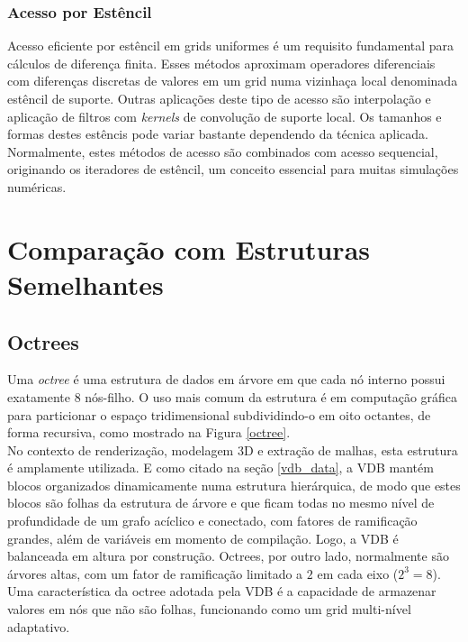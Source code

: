 \documentclass[12pt, a4paper, oneside]{book}
\begin{document}
\subsubsection{Acesso por Estêncil}
Acesso eficiente por estêncil em grids uniformes é um requisito fundamental para cálculos de diferença finita. Esses métodos aproximam operadores diferenciais com diferenças discretas de valores em um grid numa vizinhaça local denominada estêncil de suporte. Outras aplicações deste tipo de acesso são interpolação e aplicação de filtros com {\it kernels} de convolução de suporte local. Os tamanhos e formas destes estêncis pode variar bastante dependendo da técnica aplicada. Normalmente, estes métodos de acesso são combinados com acesso sequencial, originando os iteradores de estêncil, um conceito essencial para muitas simulações numéricas.



\section{Comparação com Estruturas Semelhantes}

\subsection{Octrees}
\label{octrees}

Uma \emph{octree} é uma estrutura de dados em árvore em que cada nó interno possui exatamente 8 nós-filho. O uso mais comum da estrutura é em computação gráfica para particionar o espaço tridimensional subdividindo-o em oito octantes, de forma recursiva, como mostrado na Figura \ref{octree}. \\

No contexto de renderização, modelagem 3D e extração de malhas, esta estrutura é amplamente utilizada. E como citado na seção \ref{vdb_data}, a VDB mantém blocos organizados dinamicamente numa estrutura hierárquica, de modo que estes blocos são folhas da estrutura de árvore e que ficam todas no mesmo nível de profundidade de um grafo acíclico e conectado, com fatores de ramificação grandes, além de variáveis em momento de compilação. Logo, a VDB é balanceada em altura por construção. Octrees, por outro lado, normalmente são árvores altas, com um fator de ramificação limitado a $2$ em cada eixo ($2^3 = 8$). 
Uma característica da octree adotada pela VDB é a capacidade de armazenar valores em nós que não são folhas, funcionando como um grid multi-nível adaptativo. 
\end{document}
